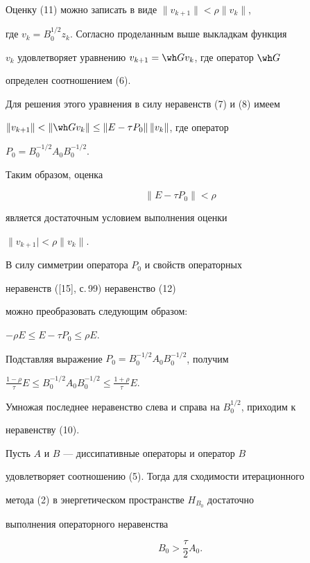 \begin{pf} 


Оценку (11) можно записать в виде $\|v_{k+1}\|<\rho\|v_k\|$, 


где $v_k=B^{1/2}_0z_k$. Согласно проделанным выше выкладкам функция 


$v_k$ удовлетворяет уравнению $v_{k+1}=\wh G v_k$, где оператор $\wh G$ 


определен соотношением (6). 


Для решения этого уравнения в силу неравенств (7) и (8) имеем 


$\|v_{k+1}\|<\|\wh G v_k\|\le\|E-\tau P_0\|\,\|v_k\|$, где оператор 


$P_0=B^{-1/2}_0A_0B^{-1/2}_0$. 


 


Таким образом, оценка 


\begin{equation} 


\|E-\tau P_0\|<\rho 


\end{equation} 


является достаточным условием выполнения оценки 


$\|v_{k+1}|<\rho\|v_k\|$. 


 


В силу симметрии оператора $P_0$ и свойств операторных 


неравенств ([15], с.\,99) неравенство (12) 


можно преобразовать следующим образом: 


$-\rho E\le E-\tau P_0\le \rho E$. 


Подставляя выражение $P_0=B^{-1/2}_0A_0B^{-1/2}_0$, получим 


$\frac{1-\rho}{\tau}E\le 


B^{-1/2}_0A_0B^{-1/2}_0\le\frac{1+\rho}{\tau}E$. 


Умножая последнее неравенство слева и справа на $B^{1/2}_0$, приходим к 


неравенству (10). 


\end{pf} 


 


\begin{cornonum} 


Пусть $A$ и $B$ --- диссипативные операторы и оператор $B$ 


удовлетворяет соотношению (5). Тогда для сходимости итерационного 


метода (2) в энергетическом пространстве $H_{B_0}$ достаточно 


выполнения операторного неравенства 


\begin{equation} 


B_0>\frac{\tau}{2}A_0. 


\end{equation} 


\end{cornonum} 


